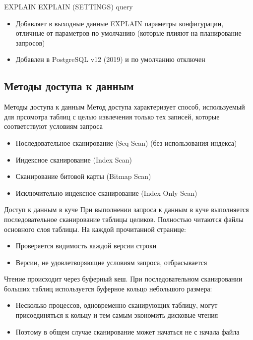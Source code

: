 \documentclass[12pt]{article}
\begin{document}
\begin{defin}{EXPLAIN}
    EXPLAIN (SETTINGS) query 

    \begin{itemize}
        \item Добавляет в выходные данные EXPLAIN параметры конфигурации, отличные от параметров по умолчанию (которые плияют на планирование запросов)
        \item Добавлен в PostgreSQL v12 (2019) и по умолчанию отключен 
    \end{itemize}
\end{defin}

\newpage 

\subsection{Методы доступа к данным}

\begin{nota}{Методы доступа к данным}
    Метод доступа характеризует способ, используемый для прсомотра таблиц с целью извлечения только тех записей, которые соответствуют условиям запроса 

    \begin{itemize}
        \item Последовательное сканирование (Seq Scan) (без использования индекса)
        \item Индексное сканирование (Index Scan)
        \item Сканирование битовой карты (Bitmap Scan)
        \item Исключительно индексное сканирование (Index Only Scan)
    \end{itemize}
\end{nota}

\begin{nota}{Доступ к данным в куче}
    При выполнении запроса к данным в куче выполняется последовательное сканирование таблицы целиков. Полностью читаются файлы основного слоя таблицы. На каждой прочитанной странице: 

    \begin{itemize}
        \item Проверяется видимость каждой версии строки
        \item Версии, не удовлетворяющие условиям запроса, отбрасывается
    \end{itemize}

    Чтение происходит через буферный кеш. При последовательном сканировании больших таблиц используется буферное кольцо небольшого размера:

    \begin{itemize}
        \item Несколько процессов, одновременно сканирующих таблицу, могут присоединяться к кольцу и тем самым экономить дисковые чтения 
        \item Поэтому в общем случае сканирование может начаться не с начала файла 
    \end{itemize}
\end{nota}
\end{document}
